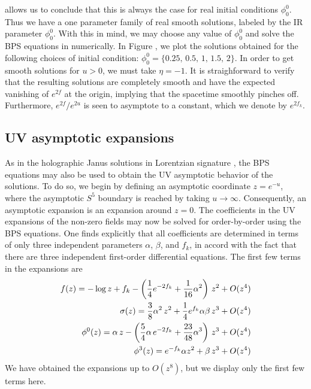 \documentclass[12pt]{article}
\begin{document}
allows us to conclude that this is always the case for real initial conditions $\phi^0_0$. Thus we have a one parameter family of real smooth solutions, labeled by the IR parameter $\phi^0_0$.
With this in mind, we may choose any value of $\phi^0_0$ and solve the BPS equations in numerically. In Figure , we plot the solutions obtained for the following choices of initial condition: $\phi^0_0=\{0.25,\,0.5,\,1,\,1.5,\,2 \}$. In order to get smooth solutions for $u>0$, we must take $\eta = -1$. It is straighforward to verify that  the resulting solutions are completely smooth and have the expected vanishing of $e^{2f}$ at the origin, implying that the spacetime smoothly pinches off. Furthermore, $e^{2f}/e^{2u}$ is seen to asymptote to a constant, which we denote by $e^{2 f_k}$.
\subsection{UV asymptotic expansions}
As in the holographic Janus solutions in Lorentzian signature , the BPS equations may also be used to obtain the UV asymptotic behavior of the solutions. To do so, we begin by defining an asymptotic coordinate $z = e^{- u}$, where the asymptotic $S^5$  boundary is reached by taking $u\to \infty$. Consequently, an asymptotic expansion is an expansion around $z=0$. The coefficients in the UV expansions of the non-zero fields may now be solved for order-by-order using the BPS equations. One finds explicitly that all coefficients are determined in terms of only three independent parameters $\alpha$, $\beta$, and $f_k$, in accord with the fact that there are three independent first-order differential equations. The first few terms in the expansions are
\begin{eqnarray}
f(z) = -\log z +f_k -  \left({1\over 4}e^{-2f_k} + {1\over 16}\alpha^2\right)  \,z^2 + O(z^4) \nonumber\\
\sigma(z) = {3\over 8} \alpha^2 \,z^2 +  {1\over 4} e^{f_k} \alpha \beta \,z^3 + O(z^4) 
\nonumber\\
\phi^0(z) = \alpha \, z - \left({5\over 4}\alpha \,e^{-2f_k} + {23\over 48} \alpha^3\right) \,z^3 + O(z^4)
\nonumber\\
\phi^3(z) = e^{-f_k} \alpha  z^2 + \beta \, z^3 + O(z^4) 
\end{eqnarray}
We have obtained the expansions up to $O(z^8)$, but we display only the first few terms here.
\end{document}
